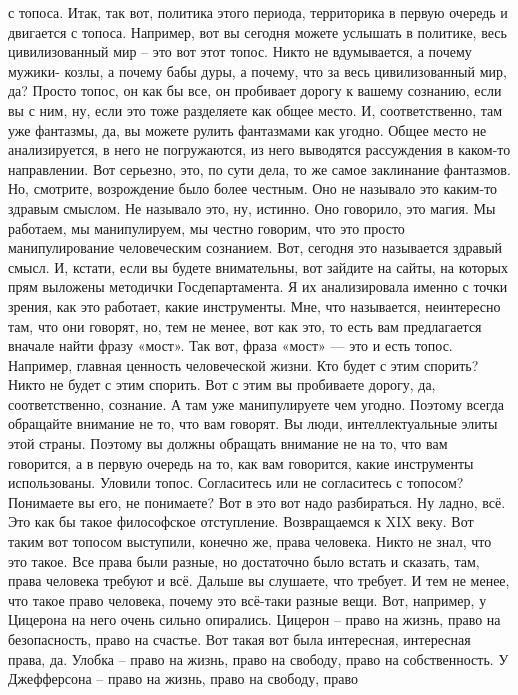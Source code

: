 с топоса. Итак, так вот, политика этого периода, территорика в первую очередь и
двигается с топоса. Например, вот вы сегодня можете услышать в политике, весь
цивилизованный мир – это вот этот топос. Никто не вдумывается, а почему мужики-
козлы, а почему бабы дуры, а почему, что за весь цивилизованный мир, да? Просто
топос, он как бы все, он пробивает дорогу к вашему сознанию, если вы с ним, ну,
если это тоже разделяете как общее место. И, соответственно, там уже фантазмы,
да, вы можете рулить фантазмами как угодно. Общее место не анализируется, в него
не погружаются, из него выводятся рассуждения в каком-то направлении. Вот
серьезно, это, по сути дела, то же самое заклинание фантазмов. Но, смотрите,
возрождение было более честным. Оно не называло это каким-то здравым смыслом. Не
называло это, ну, истинно. Оно говорило, это магия. Мы работаем, мы
манипулируем, мы честно говорим, что это просто манипулирование человеческим
сознанием. Вот, сегодня это называется здравый смысл. И, кстати, если вы будете
внимательны, вот зайдите на сайты, на которых прям выложены методички
Госдепартамента. Я их анализировала именно с точки зрения, как это работает,
какие инструменты. Мне, что называется, неинтересно там, что они говорят, но,
тем не менее, вот как это, то есть вам предлагается вначале найти фразу «мост».
Так вот, фраза «мост» — это и есть топос. Например, главная ценность
человеческой жизни. Кто будет с этим спорить? Никто не будет с этим спорить. Вот
с этим вы пробиваете дорогу, да, соответственно, сознание. А там уже
манипулируете чем угодно. Поэтому всегда обращайте внимание не то, что вам
говорят. Вы люди, интеллектуальные элиты этой страны. Поэтому вы должны обращать
внимание не на то, что вам говорится, а в первую очередь на то, как вам
говорится, какие инструменты использованы. Уловили топос. Согласитесь или не
согласитесь с топосом? Понимаете вы его, не понимаете? Вот в это вот надо
разбираться. Ну ладно, всё. Это как бы такое философское отступление.
Возвращаемся к XIX веку. Вот таким вот топосом выступили, конечно же, права
человека. Никто не знал, что это такое. Все права были разные, но достаточно
было встать и сказать, там, права человека требуют и всё. Дальше вы слушаете,
что требует. И тем не менее, что такое право человека, почему это всё-таки
разные вещи. Вот, например, у Цицерона на него очень сильно опирались. Цицерон –
право на жизнь, право на безопасность, право на счастье. Вот такая вот была
интересная, интересная права, да. Улобка – право на жизнь, право на свободу,
право на собственность. У Джефферсона – право на жизнь, право на свободу, право
